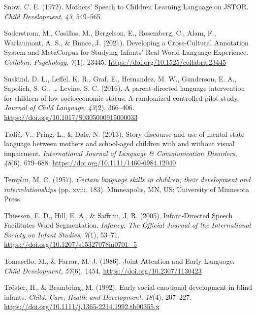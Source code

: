 \documentclass[
  man]{apa6}
\newlength{\cslhangindent}
\newlength{\cslentryspacingunit} %
\newenvironment{CSLReferences}[2] %
 {%
  \setlength{\parindent}{0pt}
  \ifodd #1
  \let\oldpar\par
  \def\par{\hangindent=\cslhangindent\oldpar}
  \fi
  \setlength{\parskip}{#2\cslentryspacingunit}
 }%
 {}
\begin{document}
\begin{CSLReferences}{1}{0}
\leavevmode{}%
Snow, C. E. (1972). Mothers' {Speech} to {Children Learning Language} on {JSTOR}. \emph{Child Development}, \emph{43}, 549--565.

\leavevmode{}%
Soderstrom, M., Casillas, M., Bergelson, E., Rosemberg, C., Alam, F., Warlaumont, A. S., \& Bunce, J. (2021). Developing a {Cross-Cultural Annotation System} and {MetaCorpus} for {Studying Infants}' {Real World Language Experience}. \emph{Collabra: Psychology}, \emph{7}(1), 23445. \url{https://doi.org/10.1525/collabra.23445}

\leavevmode{}%
Suskind, D. L., Leffel, K. R., Graf, E., Hernandez, M. W., Gunderson, E. A., Sapolich, S. G., \ldots{} Levine, S. C. (2016). A parent-directed language intervention for children of low socioeconomic status: A randomized controlled pilot study. \emph{Journal of Child Language}, \emph{43}(2), 366--406. \url{https://doi.org/10.1017/S0305000915000033}

\leavevmode{}%
Tadić, V., Pring, L., \& Dale, N. (2013). Story discourse and use of mental state language between mothers and school-aged children with and without visual impairment. \emph{International Journal of Language \& Communication Disorders}, \emph{48}(6), 679--688. \url{https://doi.org/10.1111/1460-6984.12040}

\leavevmode{}%
Templin, M. C. (1957). \emph{Certain language skills in children; their development and interrelationships} (pp. xviii, 183). Minneapolis, MN, US: University of Minnesota Press.

\leavevmode{}%
Thiessen, E. D., Hill, E. A., \& Saffran, J. R. (2005). Infant-{Directed Speech Facilitates Word Segmentation}. \emph{Infancy: The Official Journal of the International Society on Infant Studies}, \emph{7}(1), 53--71. \url{https://doi.org/10.1207/s15327078in0701_5}

\leavevmode{}%
Tomasello, M., \& Farrar, M. J. (1986). Joint {Attention} and {Early Language}. \emph{Child Development}, \emph{57}(6), 1454. \url{https://doi.org/10.2307/1130423}

\leavevmode{}%
Tröster, H., \& Brambring, M. (1992). Early social-emotional development in blind infants. \emph{Child: Care, Health and Development}, \emph{18}(4), 207--227. \url{https://doi.org/10.1111/j.1365-2214.1992.tb00355.x}


\end{CSLReferences}
\end{document}
